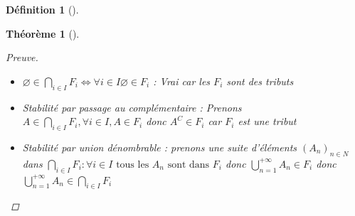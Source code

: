 \documentclass{article}
\theoremstyle{plain}%
\newtheorem{thm}{Théorème}[section]
\theoremstyle{definition}
\newtheorem{defn}{Définition}[section]
\theoremstyle{remark}
\begin{document}
\begin{defn}[]
\begin{thm}[]
\begin{proof}[Preuve]
\begin{itemize}
                \item $ \varnothing \in \bigcap_{i \in I}^{}F_i \Leftrightarrow \forall i \in I \varnothing \in F_i $ : Vrai car les $ F_i $ sont des tributs
                \item Stabilité par passage au complémentaire : Prenons $ A \in \bigcap_{i \in I}^{}F_i, \forall i \in I, A \in F_i $ donc $ A^C \in F_i $ car $ F_i $ est une tribut
                \item Stabilité par union dénombrable : prenons une suite d'éléments $ (A_n)_{n \in N} $  dans $ \bigcap_{i \in I}^{}F_i : \forall i \in I \text{ tous les } A_n \text{ sont dans } F_i$ donc $ \bigcup_{n=1}^{+\infty } A_n \in F_i$ donc  $ \bigcup_{n=1}^{+\infty } A_n \in \bigcap_{i \in I}^{}F_i $  
            \end{itemize}
        \end{proof}
    \end{thm}
\end{defn}
\end{document}
